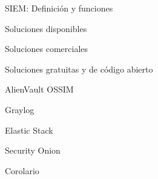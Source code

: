    \begin{section}{SIEM: Definición y funciones}
    
    \end{section}
    \begin{section}{Soluciones disponibles}
    
    
        \begin{subsection}{Soluciones comerciales}
        
        \end{subsection}
        \begin{subsection}{Soluciones gratuitas y de código abierto}
        
        
            \begin{subsubsection}{AlienVault OSSIM}
            
            \end{subsubsection}
            \begin{subsubsection}{Graylog}
            
            \end{subsubsection}
            \begin{subsubsection}{Elastic Stack}
            
            \end{subsubsection}
            \begin{subsubsection}{Security Onion}
            
            \end{subsubsection}
            
        \end{subsection} 
    \end{section}
    \begin{section}{Corolario}
    
    \end{section}
            
            
            
            
